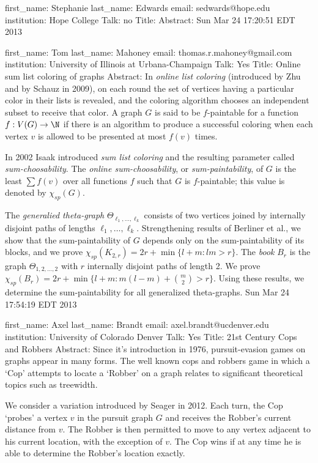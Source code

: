 \documentclass{article}
\begin{document}
first_name: Stephanie
last_name: Edwards
email: sedwards@hope.edu
institution: Hope College
Talk: no
Title:
Abstract:
Sun Mar 24 17:20:51 EDT 2013

first_name: Tom
last_name: Mahoney
email: thomas.r.mahoney@gmail.com
institution: University of Illinois at Urbana-Champaign
Talk: Yes
Title: Online sum list coloring of graphs
Abstract: In \textit{online list coloring} (introduced by Zhu and by Schauz in 2009), on each round the set of vertices having a particular color in their lists is revealed, and the coloring algorithm chooses an independent subset to receive that color. A graph $G$ is said to be $f$-paintable for a function $f:V(G)\to\N$ if there is an algorithm to produce a successful coloring when each vertex $v$ is allowed to be presented at most $f(v)$ times.

In 2002 Isaak introduced \textit{sum list coloring} and the resulting parameter called \textit{sum-choosability}. The \textit{online sum-choosability}, or \textit{sum-paintability}, of $G$  is the least $\sum f(v)$ over all functions $f$ such that $G$ is $f$-paintable; this value is denoted by $\chi_{sp}(G)$.

The \textit{generalied theta-graph} $\Theta_{\ell_1,\dots,\ell_k}$ consists of two vertices joined by internally disjoint paths of lengths $\ell_1,\dots,\ell_k$.
Strengthening results of Berliner et al., we show that the sum-paintability of $G$ depends only on the sum-paintability of its blocks, and we prove $\chi_{sp}(K_{2,r})=2r+\min\{ l + m : lm>r \}$.
The \textit{book} $B_r$ is the graph $\Theta_{1,2,\dots,2}$ with $r$ internally disjoint paths of length 2. We prove $\chi_{sp}(B_r)=2r+\min\{ l + m : m(l-m)+{m\choose2} > r \}$.
Using these results, we determine the sum-paintability for all generalized theta-graphs.
Sun Mar 24 17:54:19 EDT 2013

first_name: Axel
last_name: Brandt
email: axel.brandt@ucdenver.edu
institution: University of Colorado Denver
Talk: Yes
Title: 21st Century Cops and Robbers
Abstract: Since it's introduction in 1976, pursuit-evasion games on graphs appear in many forms. The well known cops and robbers game in which a `Cop' attempts to locate a `Robber' on a graph relates to significant theoretical topics such as treewidth.

We consider a variation introduced by Seager in 2012. Each turn, the Cop `probes' a vertex $v$ in the pursuit graph $G$ and receives the Robber's current distance from $v$. The Robber is then permitted to move to any vertex adjacent to his current location, with the exception of $v$. The Cop wins if at any time he is able to determine the Robber's location exactly.
\end{document}
